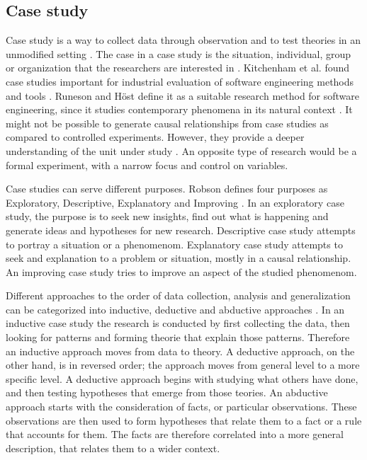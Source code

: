 \documentclass[english]{tktltiki2}
\theoremstyle{definition}
\theoremstyle{remark}
\begin{document}
\subsection{Case study}
Case study is a way to collect data through observation and to test theories in an unmodified setting \cite{zelkowitz1998experimental}. The case in a case study is the situation, individual, group or organization that the researchers are interested in \cite{robson2002real}. Kitchenham et al. found case studies important for industrial evaluation of software engineering methods and tools \cite{kitchenham1995case}. Runeson and Höst define it as a suitable research method for software engineering, since it studies contemporary phenomena in its natural context \cite{runeson2009guidelines}. It might not be possible to generate causal relationships from case studies as compared to controlled experiments. However, they provide a deeper understanding of the unit under study \cite{runeson2009guidelines}. An opposite type of research would be a formal experiment, with a narrow focus and control on variables. 

Case studies can serve different purposes. Robson defines four purposes as Exploratory, Descriptive, Explanatory and Improving \cite{robson2002real}. In an exploratory case study, the purpose is to seek new insights, find out what is happening and generate ideas and hypotheses for new research. Descriptive case study attempts to portray a situation or a phenomenom. Explanatory case study attempts to seek and explanation to a problem or situation, mostly in a causal relationship. An improving case study tries to improve an aspect of the studied phenomenom.  

Different approaches to the order of data collection, analysis and generalization can be categorized into inductive, deductive and abductive approaches \cite{dubois2002systematic}. In an inductive case study the research is conducted by first collecting the data, then looking for patterns and forming theorie that explain those patterns. Therefore an inductive approach moves from data to theory. A deductive approach, on the other hand, is in reversed order; the approach moves from general level to a more specific level. A deductive approach begins with studying what others have done, and then testing hypotheses that emerge from those teories. An abductive approach starts with the consideration of facts, or particular observations. These observations are then used to form hypotheses that relate them to a fact or a rule that accounts for them. The facts are therefore correlated into a more general description, that relates them to a wider context.
\end{document}
